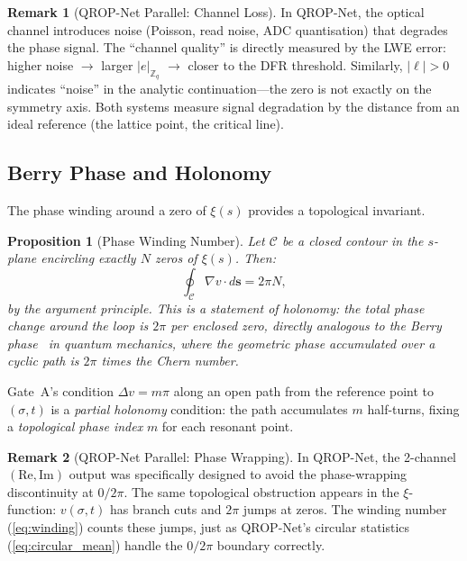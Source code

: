 \documentclass[11pt, a4paper]{article}
\theoremstyle{definition}
\newtheorem{remark}{Remark}[section]
\theoremstyle{plain}
\newtheorem{proposition}[theorem]{Proposition}
\newcommand{\Zq}{\mathbb{Z}_q}
\newcommand{\xif}{\xi}                      %
\begin{document}
\begin{remark}[QROP-Net Parallel: Channel Loss]
\label{rem:unitarity}
In QROP-Net, the optical channel introduces noise (Poisson, read noise,
ADC quantisation) that degrades the phase signal. The ``channel quality''
is directly measured by the LWE error: higher noise $\to$ larger $|e|_{\Zq}$
$\to$ closer to the DFR threshold. Similarly, $|\ell| > 0$ indicates
``noise'' in the analytic continuation---the zero is not exactly on the
symmetry axis. Both systems measure signal degradation by the distance
from an ideal reference (the lattice point, the critical line).
\end{remark}


\subsection{Berry Phase and Holonomy}
\label{sec:berry}

The phase winding around a zero of $\xif(s)$ provides a topological
invariant.

\begin{proposition}[Phase Winding Number]
\label{prop:winding}
Let $\mathcal{C}$ be a closed contour in the $s$-plane encircling
exactly $N$ zeros of $\xif(s)$. Then:
\begin{equation}
  \oint_{\mathcal{C}} \nabla v \cdot d\mathbf{s} = 2\pi N,
  \label{eq:winding}
\end{equation}
by the argument principle. This is a statement of \textit{holonomy}:
the total phase change around the loop is $2\pi$ per enclosed zero,
directly analogous to the Berry phase~\cite{berry1984} in quantum
mechanics, where the geometric phase accumulated over a cyclic path
is $2\pi$ times the Chern number.
\end{proposition}

Gate~A's condition $\Delta v = m\pi$ along an open path from the
reference point to $(\sigma, t)$ is a \textit{partial holonomy}
condition: the path accumulates $m$ half-turns, fixing a
\textit{topological phase index} $m$ for each resonant point.

\begin{remark}[QROP-Net Parallel: Phase Wrapping]
\label{rem:phase_wrapping}
In QROP-Net, the 2-channel $(\mathrm{Re}, \mathrm{Im})$ output was
specifically designed to avoid the phase-wrapping discontinuity at
$0/2\pi$. The same topological obstruction appears in the
$\xif$-function: $v(\sigma,t)$ has branch cuts and $2\pi$ jumps at
zeros. The winding number (\cref{eq:winding}) counts these jumps,
just as QROP-Net's circular statistics (\cref{eq:circular_mean})
handle the $0/2\pi$ boundary correctly.
\end{remark}
\end{document}
